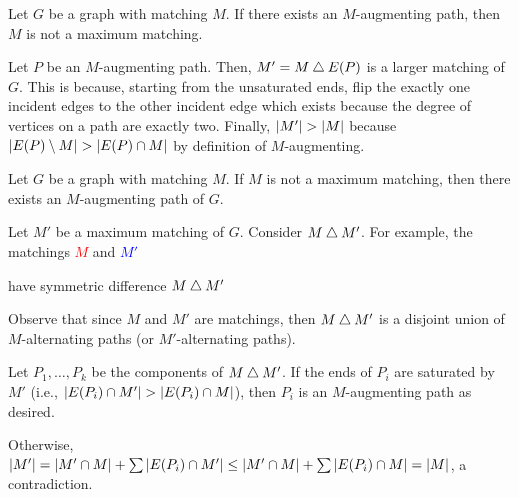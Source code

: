 \documentclass[class=math239,notes,tikz]{agony}
\begin{document}
\begin{lemma}[8.1.1]\label{lem:811}
  Let $G$ be a graph with matching $M$.
  If there exists an $M$-augmenting path, then $M$ is not a maximum matching.
\end{lemma}
\begin{prf}
  Let $P$ be an $M$-augmenting path.
  Then, $M' = M \mathbin{\triangle} E(P)$ is a larger matching of $G$.
  This is because, starting from the unsaturated ends,
  flip the exactly one incident edges to the other incident edge
  which exists because the degree of vertices on a path are exactly two.
  Finally, $\abs{M'} > \abs{M}$ because $\abs{E(P) \setminus M} > \abs{E(P) \cap M}$
  by definition of $M$-augmenting.
\end{prf}

\begin{lemma}
  Let $G$ be a graph with matching $M$.
  If $M$ is not a maximum matching,
  then there exists an $M$-augmenting path of $G$.
\end{lemma}
\begin{prf}
  Let $M'$ be a maximum matching of $G$.
  Consider $M \mathbin{\triangle} M'$.
  For example, the matchings \textcolor{red}{$M$} and \textcolor{blue}{$M'$}
  \begin{center}
  \end{center}
  have symmetric difference \textcolor{violet}{$M \mathbin{\triangle} M'$}
  \begin{center}
  \end{center}
  Observe that since $M$ and $M'$ are matchings,
  then $M \mathbin{\triangle} M'$ is a disjoint union of $M$-alternating paths (or $M'$-alternating paths).

  Let $P_1,\dotsc,P_k$ be the components of $M \mathbin{\triangle} M'$.
  If the ends of $P_i$ are saturated by $M'$
  (i.e., $\abs{E(P_i) \cap M'} > \abs{E(P_i) \cap M}$),
  then $P_i$ is an $M$-augmenting path as desired.

  Otherwise, $\abs{M'} = \abs{M' \cap M} + \sum\abs{E(P_i) \cap M'}
    \leq \abs{M' \cap M} + \sum\abs{E(P_i) \cap M} = \abs{M}$,
  a contradiction.
\end{prf}
\end{document}
